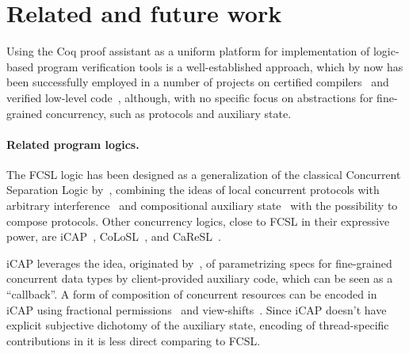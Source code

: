 
\section{Related and future work}
\label{sec:related-work}

Using the Coq proof assistant as a uniform platform for implementation
of logic-based program verification tools is a well-established
approach, which by now has been successfully employed in a number of
projects on certified compilers~\cite{Leroy:POPL06,Appel-al:BOOK14}
and verified low-level
code~\cite{Shao:CACM10,Chlipala:PLDI11,Jensen-al:POPL13}, although,
with no specific focus on abstractions for fine-grained concurrency,
such as protocols and auxiliary state.
%


\paragraph{Related program logics.~~}
\label{sec:relat-logic-fram}

The FCSL logic has been designed as a generalization of the classical
Concurrent Separation Logic by~\citet{OHearn:TCS07}, combining the
ideas of local concurrent protocols with arbitrary
interference~\cite{Jones:TOPLAS83,Feng:POPL09} and compositional
auxiliary state~\cite{LeyWild-Nanevski:POPL13} with the possibility to
compose protocols.
%
%
Other concurrency logics, close to FCSL in their expressive power, are
iCAP~\cite{Svendsen-Birkedal:ESOP14}, CoLoSL~\cite{Raad-al:colosl},
and CaReSL~\cite{Turon-al:ICFP13}.
 
iCAP leverages the idea, originated by~\citet{Jacobs-Piessens:POPL11},
of parametrizing specs for fine-grained concurrent data types by
client-provided auxiliary code, which can be seen as a ``callback''. A
form of composition of concurrent resources can be encoded in iCAP
using fractional permissions~\cite{Bornat-al:POPL05} and
view-shifts~\cite{DinsdaleYoung-al:POPL13}.
%
Since iCAP doesn't have explicit subjective dichotomy of the auxiliary
state, encoding of thread-specific contributions in it is less direct
comparing to FCSL.

